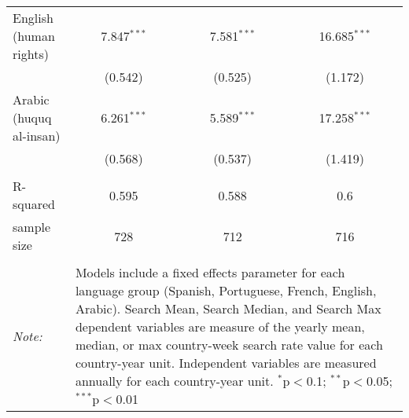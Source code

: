\begin{table}[!htbp]
\begin{tabular}{@{\extracolsep{5pt}}lccc}
  English (human rights) & 7.847$^{***}$ & 7.581$^{***}$ & 16.685$^{***}$ \\ 
  & (0.542) & (0.525) & (1.172) \\ 
  Arabic (huquq al-insan) & 6.261$^{***}$ & 5.589$^{***}$ & 17.258$^{***}$ \\ 
  & (0.568) & (0.537) & (1.419) \\ 
 \hline \\[-1.8ex] 
R-squared  & 0.595 & 0.588 & 0.6 \\ 
sample size  & 728 & 712 & 716 \\ 
\hline 
\hline \\[-1.8ex] 
\textit{Note:}  & \multicolumn{3}{l}{\parbox[t]{8cm}{Models include a fixed effects parameter for each language group (Spanish, Portuguese, French, English, Arabic). Search Mean, Search Median, and Search Max dependent variables are measure of the yearly mean, median, or max country-week search rate value for each country-year unit. Independent variables are measured annually for each country-year unit. $^{*}$p$<$0.1; $^{**}$p$<$0.05; $^{***}$p$<$0.01}} \\ 
\end{tabular} 
\end{table} 
